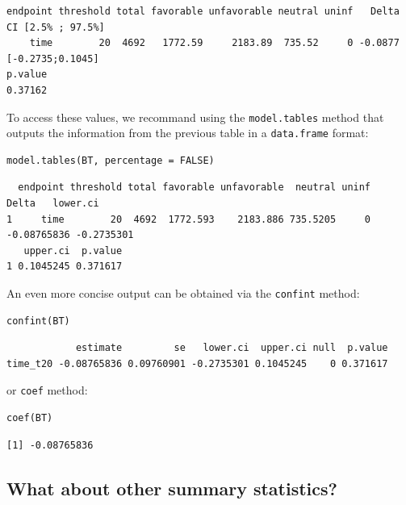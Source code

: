 \documentclass[12pt]{article}
\begin{document}
\begin{verbatim}
endpoint threshold total favorable unfavorable neutral uninf   Delta CI [2.5% ; 97.5%]
    time        20  4692   1772.59     2183.89  735.52     0 -0.0877  [-0.2735;0.1045]
p.value
0.37162
\end{verbatim}


\bigskip

To access these values, we recommand using the \texttt{model.tables} method
that outputs the information from the previous table in a \texttt{data.frame}
format:

\lstset{language=r,label= ,caption= ,captionpos=b,numbers=none}
\begin{lstlisting}
model.tables(BT, percentage = FALSE)
\end{lstlisting}

\begin{verbatim}
  endpoint threshold total favorable unfavorable  neutral uninf       Delta   lower.ci
1     time        20  4692  1772.593    2183.886 735.5205     0 -0.08765836 -0.2735301
   upper.ci  p.value
1 0.1045245 0.371617
\end{verbatim}


\bigskip

An even more concise output can be obtained via the \texttt{confint} method:
\lstset{language=r,label= ,caption= ,captionpos=b,numbers=none}
\begin{lstlisting}
confint(BT)
\end{lstlisting}

\begin{verbatim}
            estimate         se   lower.ci  upper.ci null  p.value
time_t20 -0.08765836 0.09760901 -0.2735301 0.1045245    0 0.371617
\end{verbatim}


or \texttt{coef} method:
\lstset{language=r,label= ,caption= ,captionpos=b,numbers=none}
\begin{lstlisting}
coef(BT)
\end{lstlisting}

\begin{verbatim}
[1] -0.08765836
\end{verbatim}


\bigskip

\subsection{What about other summary statistics?}
\label{sec:org5a43f83}
\end{document}
